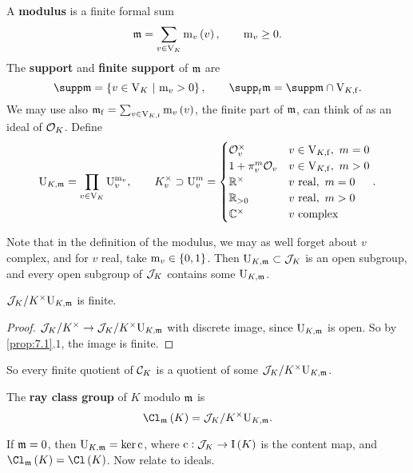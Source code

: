 \pagebreak

\begin{definition*}
A \textbf{modulus} is a finite formal sum
$$ \mmm = \sum_{v \in \V_K} \m_v\br{v}, \qquad \m_v \ge 0. $$
The \textbf{support} and \textbf{finite support} of $ \mathfrak{m} $ are
$$ \supp \mmm = \cbr{v \in \V_K \st \m_v > 0}, \qquad \supp_\f \mmm = \supp \mmm \cap \V_{K, \f}. $$
We may use also $ \mmm_\f = \sum_{v \in \V_{K, \f}} \m_v\br{v} $, the finite part of $ \mathfrak{m} $, can think of as an ideal of $ \mathcal{O}_K $. Define
$$ \mathrm{U}_{K, \mathfrak{m}} = \prod_{v \in \mathrm{V}_K} \mathrm{U}_v^{\mathrm{m}_v}, \qquad K_v^\times \supset \mathrm{U}_v^m =
\begin{cases}
\mathcal{O}_v^\times & v \in \mathrm{V}_{K, \mathrm{f}}, \ m = 0 \\
1 + \pi_v^m\mathcal{O}_v & v \in \mathrm{V}_{K, \mathrm{f}}, \ m > 0 \\
\mathbb{R}^\times & v \ \text{real}, \ m = 0 \\
\mathbb{R}_{> 0} & v \ \text{real}, \ m > 0 \\
\mathbb{C}^\times & v \ \text{complex}
\end{cases}.
$$
\end{definition*}

Note that in the definition of the modulus, we may as well forget about $ v $ complex, and for $ v $ real, take $ \m_v \in \cbr{0, 1} $. Then $ \mathrm{U}_{K, \mathfrak{m}} \subset \mathcal{J}_K $ is an open subgroup, and every open subgroup of $ \mathcal{J}_K $ contains some $ \mathrm{U}_{K, \mathfrak{m}} $.

\begin{proposition}
$ \mathcal{J}_K / K^\times\mathrm{U}_{K, \mathfrak{m}} $ is finite.
\end{proposition}

\begin{proof}
$ \mathcal{J}_K / K^\times \to \mathcal{J}_K / K^\times\mathrm{U}_{K, \mathfrak{m}} $ with discrete image, since $ \mathrm{U}_{K, \mathfrak{m}} $ is open. So by \ref{prop:7.1}.$ 1 $, the image is finite.
\end{proof}

So every finite quotient of $ \mathcal{C}_K $ is a quotient of some $ \mathcal{J}_K / K^\times\mathrm{U}_{K, \mathfrak{m}} $.

\begin{definition*}
The \textbf{ray class group} of $ K $ modulo $ \mathfrak{m} $ is
$$ \Cl_\mmm\br{K} = \JJJ_K / K^\times\U_{K, \mmm}. $$
\end{definition*}

If $ \mathfrak{m} = 0 $, then $ \mathrm{U}_{K, \mathfrak{m}} = \ker \mathrm{c} $, where $ \c : \JJJ_K \to \I\br{K} $ is the content map, and $ \Cl_\mmm\br{K} = \Cl\br{K} $. Now relate to ideals.

